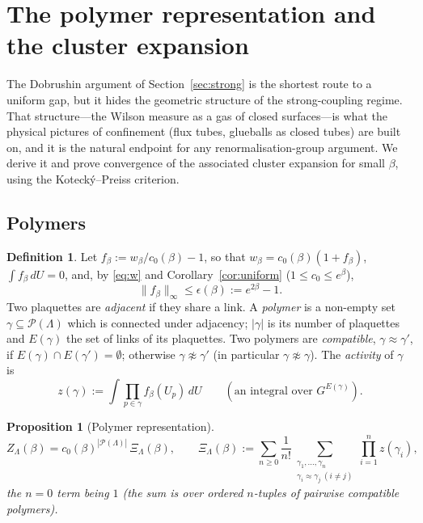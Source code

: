 \documentclass[11pt,a4paper]{article}
\newtheorem{proposition}[theorem]{Proposition}
\theoremstyle{definition}
\newtheorem{definition}[theorem]{Definition}
\theoremstyle{remark}
\newcommand{\cP}{\mathcal{P}}
\newcommand{\dU}{\,dU}
\newcommand{\norm}[1]{\lVert #1\rVert}
\begin{document}
\section{The polymer representation and the cluster expansion}\label{sec:polymer}

The Dobrushin argument of Section~\ref{sec:strong} is the shortest route to a uniform gap, but it hides the
geometric structure of the strong-coupling regime. That structure---the Wilson measure as a gas of closed
surfaces---is what the physical pictures of confinement (flux tubes, glueballs as closed tubes) are built on,
and it is the natural endpoint for any renormalisation-group argument. We derive it and prove convergence of
the associated cluster expansion for small $\beta$, using the Kotecký--Preiss criterion.

\subsection{Polymers}

\begin{definition}\label{def:polymer}
Let $f_\beta:=w_\beta/c_0(\beta)-1$, so that $w_\beta=c_0(\beta)(1+f_\beta)$, $\int f_\beta\dU=0$, and, by
\eqref{eq:w} and Corollary~\ref{cor:uniform} ($1\le c_0\le e^\beta$),
\begin{equation}\label{eq:eps}
\norm{f_\beta}_\infty\le\epsilon(\beta):=e^{2\beta}-1 .
\end{equation}
Two plaquettes are \emph{adjacent} if they share a link. A \emph{polymer} is a non-empty set $\gamma\subseteq\cP(\Lambda)$
which is connected under adjacency; $|\gamma|$ is its number of plaquettes and $E(\gamma)$ the set of links of its
plaquettes. Two polymers are \emph{compatible}, $\gamma\approx\gamma'$, if $E(\gamma)\cap E(\gamma')=\emptyset$; otherwise
$\gamma\not\approx\gamma'$ (in particular $\gamma\not\approx\gamma$). The \emph{activity} of $\gamma$ is
\[
z(\gamma):=\int\prod_{p\in\gamma}f_\beta(U_p)\dU\qquad(\text{an integral over }G^{E(\gamma)}).
\]
\end{definition}

\begin{proposition}[Polymer representation]\label{prop:polymer}
\[
Z_\Lambda(\beta)=c_0(\beta)^{|\cP(\Lambda)|}\,\Xi_\Lambda(\beta),\qquad
\Xi_\Lambda(\beta):=\sum_{n\ge0}\frac1{n!}\sum_{\substack{\gamma_1,\dots,\gamma_n\\ \gamma_i\approx\gamma_j\ (i\ne j)}}\prod_{i=1}^nz(\gamma_i),
\]
the $n=0$ term being $1$ (the sum is over ordered $n$-tuples of pairwise compatible polymers).
\end{proposition}
\end{document}
